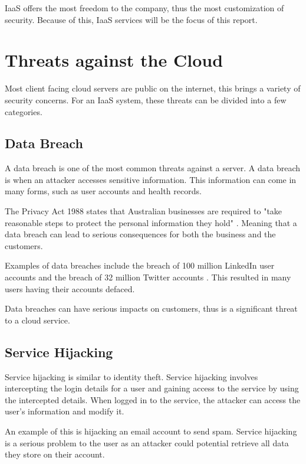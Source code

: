 IaaS offers the most freedom to the company, thus the most customization of security. Because of this, IaaS services will be the focus of this report.

\section{Threats against the Cloud}

Most client facing cloud servers are public on the internet, this brings a variety of security concerns. For an IaaS system, these threats can be divided into a few categories.

\subsection{Data Breach}

A data breach is one of the most common threats against a server. A data breach is when an attacker accesses sensitive information. This information can come in many forms, such as user accounts and health records. 

The Privacy Act 1988 states that Australian businesses are required to "take reasonable steps to protect the personal information they hold" \cite{office_of_the_australia_information_commissioner_rights_2016}. Meaning that a data breach can lead to serious consequences for both the business and the customers.

Examples of data breaches include the breach of 100 million LinkedIn user accounts \cite{linkedin_update_2012} and the breach of 32 million Twitter accounts \cite{leakedsource_leakedsource_2016}. This resulted in many users having their accounts defaced.

Data breaches can have serious impacts on customers, thus is a significant threat to a cloud service.

\subsection{Service Hijacking}

Service hijacking is similar to identity theft. Service hijacking involves intercepting the login details for a user and gaining access to the service by using the intercepted details. When logged in to the service, the attacker can access the user's information and modify it.

An example of this is hijacking an email account to send spam. Service hijacking is a serious problem to the user as an attacker could potential retrieve all data they store on their account.

